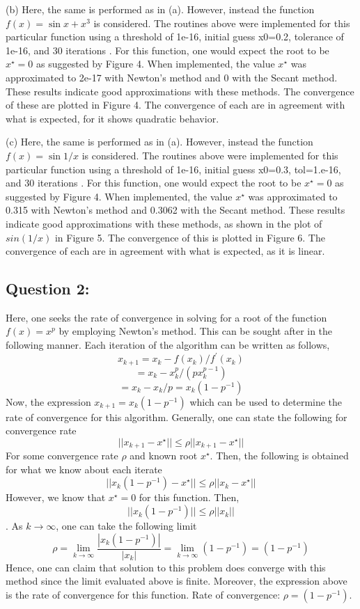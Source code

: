 \documentclass{article}
\begin{document}
\newline \newline 
(b) Here, the same is performed as in (a). However, instead the function $f(x) = \sin x + x^{3}$ is considered. The routines above were implemented for this particular function using a threshold of  1e-16, initial guess x0=0.2, tolerance of 1e-16, and 30 iterations . For this function, one would expect the root to be $x^{\star} =0$ as suggested by Figure 4. When implemented, the value $x^{\star}$  was approximated to 2e-17 with Newton's method and 0 with the Secant method. These results indicate good approximations with these methods.  The convergence of these are plotted in Figure 4.  The convergence of each are in agreement with what is expected, for it shows quadratic behavior. 
\newline \newline 


(c) Here, the same is performed as in (a). However, instead the function $f(x) = \sin 1/x$   is considered. The routines above were implemented for this particular function using a threshold of  1e-16, initial guess x0=0.3, tol=1.e-16, and 30 iterations . For this function, one would expect the root to be $x^{\star} =0$ as suggested by Figure 4. When implemented, the value $x^{\star}$  was approximated to 0.315 with Newton's method and 0.3062 with the Secant method. These results indicate good approximations with these methods, as shown in the plot of $sin(1/x)$ in Figure 5.  The convergence of this is plotted in Figure 6.  The convergence of each are in agreement with what is expected, as it is linear. 
\newline \newline 


\subsection*{Question 2:}
Here, one seeks the rate of convergence in solving for a root of the function $f(x) =x^{p}$ by employing Newton's method. This can be sought after in the following manner. Each iteration of the algorithm can be written as  follows, 
$$ x_{k+1} = x_{k} - f(x_{k})/ f^{\prime}(x_{k}) $$ 
$$ =   x_{k} - x_{k}^{p} / ( px_{k}^{p-1}) $$
$$ =  x_{k} -  x_{k}/p = x_{k} (1-p^{-1}) $$
Now, the expression $x_{k+1} =x_{k} (1-p^{-1}) $  which can be used to determine the rate of convergence for this algorithm. Generally, one can state the following for convergence rate
$$ ||x_{k+1} - x^{\star} || \leq \rho ||x_{k+1} - x^{\star} ||$$ 
For some convergence rate $ \rho $ and known root $x^{\star}$. Then, the following is obtained for what we know about each iterate 
$$  ||x_{k} (1-p^{-1})  - x^{\star} || \leq \rho ||x_{k} - x^{\star} ||$$ 
However, we know that $ x^{\star}=0$ for this function. Then, $$  ||x_{k} (1-p^{-1})  || \leq \rho ||x_{k}||$$ . As $k \rightarrow \infty$,  one can take the following limit 
$$\rho = \lim_{k \rightarrow \infty} \frac{|x_{k} (1-p^{-1}) |}{|x_{k}|} =  \lim_{k \rightarrow \infty}  (1-p^{-1})  =  (1-p^{-1}) $$  
Hence, one can claim that solution to this problem does converge with this method since the limit evaluated above is finite. Moreover, the expression above is the rate of convergence for this function. Rate of convergence: $\rho = (1-p^{-1})$. 
\end{document}
